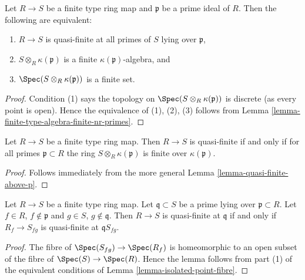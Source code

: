 \begin{lemma}
\label{lemma-quasi-finite-above-p}
Let $R \to S$ be a finite type ring map
and $\mathfrak p$ be a prime ideal of $R$.
Then the following are equivalent:
\begin{enumerate}
\item $R \to S$ is quasi-finite at all primes of $S$ lying over $\mathfrak p$,
\item $S \otimes_R \kappa(\mathfrak p)$ is a finite
$\kappa(\mathfrak p)$-algebra, and
\item $\Spec(S \otimes_R \kappa(\mathfrak p))$ is a finite set.
\end{enumerate}
\end{lemma}

\begin{proof}
Condition (1) says the topology on
$\Spec(S \otimes_R \kappa(\mathfrak p))$ is discrete (as every point
is open). Hence the equivalence of (1), (2), (3) follows from
Lemma \ref{lemma-finite-type-algebra-finite-nr-primes}.
\end{proof}

\begin{lemma}
\label{lemma-quasi-finite}
Let $R \to S$ be a finite type ring map. Then $R \to S$ is quasi-finite
if and only if for all primes $\mathfrak p \subset R$ the ring
$S \otimes_R \kappa(\mathfrak p)$ is finite over $\kappa(\mathfrak p)$.
\end{lemma}

\begin{proof}
Follows immediately from the more general
Lemma \ref{lemma-quasi-finite-above-p}.
\end{proof}

\begin{lemma}
\label{lemma-quasi-finite-local}
Let $R \to S$ be a finite type ring map. Let $\mathfrak q \subset S$
be a prime lying over $\mathfrak p \subset R$. Let
$f \in R$, $f \not \in \mathfrak p$ and $g \in S$, $g \not \in \mathfrak q$.
Then $R \to S$ is quasi-finite at $\mathfrak q$ if and only if
$R_f \to S_{fg}$ is quasi-finite at $\mathfrak qS_{fg}$.
\end{lemma}

\begin{proof}
The fibre of $\Spec(S_{fg}) \to \Spec(R_f)$ is homeomorphic
to an open subset of the fibre of $\Spec(S) \to \Spec(R)$.
Hence the lemma follows from part (1) of the equivalent conditions of
Lemma \ref{lemma-isolated-point-fibre}.
\end{proof}

